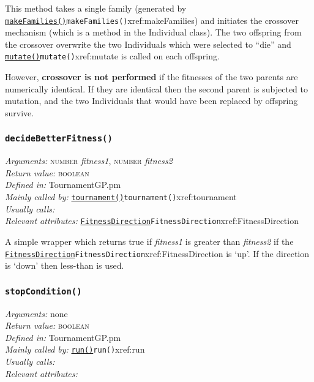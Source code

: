 \documentclass[a4paper]{article}
\begin{document}
This method takes a single family (generated by
\hyperref[no]{\texttt{makeFamilies()}}{\texttt{makeFamilies()}}{xref:makeFamilies}) and initiates the crossover mechanism (which
is a method in the Individual class).  The two offspring from the
crossover overwrite the two Individuals which were selected to ``die''
and \hyperref[no]{\texttt{mutate()}}{\texttt{mutate()}}{xref:mutate} is called on each offspring.

However, \textbf{crossover is not performed} if the fitnesses of the
two parents are numerically identical.  If they are identical then the
second parent is subjected to mutation, and the two Individuals that
would have been replaced by offspring survive.


\subsubsection{\texttt{decideBetterFitness()}}\label{xref:decideBetterFitness}
\begin{flushleft}
\textit{Arguments:} \textsc{number} \textit{fitness1}, \textsc{number} \textit{fitness2}\\
\textit{Return value:} \textsc{boolean}\\
\textit{Defined in:} TournamentGP.pm\\
\textit{Mainly called by:} \hyperref[no]{\texttt{tournament()}}{\texttt{tournament()}}{xref:tournament}\\
\textit{Usually calls:} \\
\textit{Relevant attributes:} \hyperref[no]{\texttt{FitnessDirection}}{\texttt{FitnessDirection}}{xref:FitnessDirection}
\end{flushleft}

A simple wrapper which returns true if \textit{fitness1} is greater
than \textit{fitness2} if the \hyperref[no]{\texttt{FitnessDirection}}{\texttt{FitnessDirection}}{xref:FitnessDirection} is `up'.  If
the direction is `down' then less-than is used.

\subsubsection{\texttt{stopCondition()}}\label{xref:stopCondition}
\begin{flushleft}
\textit{Arguments:} none\\
\textit{Return value:} \textsc{boolean}\\
\textit{Defined in:} TournamentGP.pm\\
\textit{Mainly called by:} \hyperref[no]{\texttt{run()}}{\texttt{run()}}{xref:run}\\
\textit{Usually calls:} \\
\textit{Relevant attributes:}
\end{flushleft}
\end{document}
